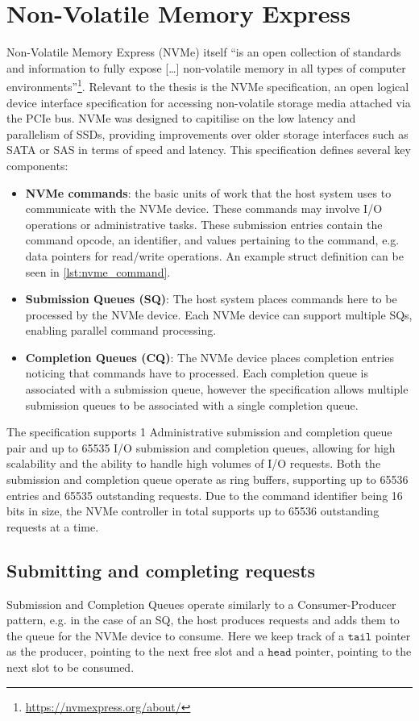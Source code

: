 \section{Non-Volatile Memory Express}
Non-Volatile Memory Express (NVMe) itself ``is an open collection of standards and information to fully expose [\ldots] non-volatile memory in all types of computer environments''\footnote{\url{https://nvmexpress.org/about/}}. Relevant to the thesis is the NVMe specification, an open logical device interface specification for accessing non-volatile storage media attached via the PCIe bus. NVMe was designed to capitilise on the low latency and parallelism of SSDs, providing improvements over older storage interfaces such as SATA or SAS in terms of speed and latency. This specification defines several key components:
\begin{itemize}
        \item \textbf{NVMe commands}: the basic units of work that the host system uses to communicate with the NVMe device. These commands may involve I/O operations or administrative tasks. These submission entries contain the command opcode, an identifier, and values pertaining to the command, e.g. data pointers for read/write operations. An example struct definition can be seen in \autoref{lst:nvme_command}.
        \item \textbf{Submission Queues (SQ)}: The host system places commands here to be processed by the NVMe device. Each NVMe device can support multiple SQs, enabling parallel command processing.
        \item \textbf{Completion Queues (CQ)}: The NVMe device places completion entries noticing that commands have to processed. Each completion queue is associated with a submission queue, however the specification allows multiple submission queues to be associated with a single completion queue.
\end{itemize}


The specification supports 1 Administrative submission and completion queue pair and up to 65535 I/O submission and completion queues, allowing for high scalability and the ability to handle high volumes of I/O requests. Both the submission and completion queue operate as ring buffers, supporting up to 65536 entries and 65535 outstanding requests. Due to the command identifier being 16 bits in size, the NVMe controller in total supports up to 65536 outstanding requests at a time.

\subsection{Submitting and completing requests}
Submission and Completion Queues operate similarly to a Consumer-Producer pattern, e.g. in the case of an SQ, the host produces requests and adds them to the queue for the NVMe device to consume. Here we keep track of a $\texttt{tail}$ pointer as the producer, pointing to the next free slot and a $\texttt{head}$ pointer, pointing to the next slot to be consumed.

